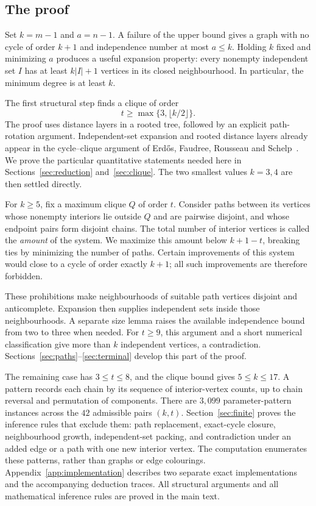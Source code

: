 \subsection{The proof}

Set $k=m-1$ and $a=n-1$. A failure of the upper bound gives a graph with
no cycle of order $k+1$ and independence number at most $a\le k$.
Holding $k$ fixed and minimizing $a$ produces a useful expansion property: every
nonempty independent set $I$ has at least $k|I|+1$ vertices in its closed
neighbourhood. In particular, the minimum degree is at least $k$.

The first structural step finds a clique of order
\[
 t\ge\max\{3,\lfloor k/2\rfloor\}.
\]
The proof uses distance layers in a rooted tree, followed by an explicit
path-rotation argument. Independent-set expansion and rooted distance
layers already appear in the cycle--clique argument of Erd\H{o}s,
Faudree, Rousseau and Schelp~\cite[Section~3]{ErdosFaudreeRousseauSchelp1978}.
We prove the particular quantitative statements needed here in
Sections~\ref{sec:reduction} and~\ref{sec:clique}.
The two smallest values $k=3,4$ are then settled directly.

For $k\ge5$, fix a maximum clique $Q$ of order $t$. Consider paths between
its vertices whose nonempty interiors lie outside $Q$ and are pairwise
disjoint, and whose endpoint pairs form disjoint chains. The total number
of interior vertices is called the \emph{amount} of the system. We maximize
this amount below $k+1-t$, breaking ties by minimizing the number of paths.
Certain improvements of this system would close to a cycle of order
exactly $k+1$; all such improvements are therefore forbidden.

These prohibitions make neighbourhoods of suitable path vertices
disjoint and anticomplete. Expansion then supplies independent sets
inside those neighbourhoods. A separate size lemma raises the available
independence bound from two to three when needed. For $t\ge9$, this
argument and a short numerical classification give more than $k$
independent vertices, a contradiction. Sections~\ref{sec:paths}--\ref{sec:terminal}
develop this part of the proof.

The remaining case has $3\le t\le8$, and the clique bound gives
$5\le k\le17$. A pattern records each chain by its sequence of
interior-vertex counts, up to chain reversal and permutation of components.
There are $3{,}099$ parameter-pattern instances across the $42$ admissible
pairs $(k,t)$. Section~\ref{sec:finite} proves the inference rules that
exclude them: path replacement, exact-cycle closure, neighbourhood
growth, independent-set packing, and contradiction under an added edge
or a path with one new interior vertex. The computation enumerates these
patterns, rather than graphs or edge colourings. Appendix~\ref{app:implementation}
describes two separate exact implementations and the accompanying
deduction traces. All structural arguments and all mathematical
inference rules are proved in the main text.
